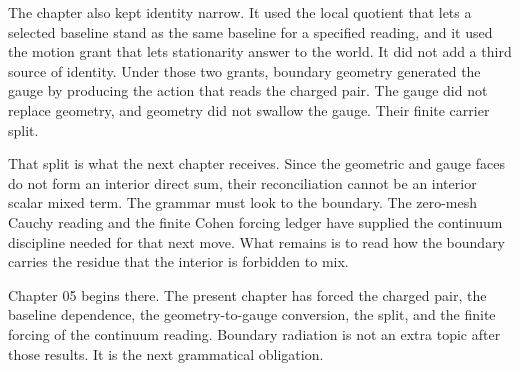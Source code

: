 The chapter also kept identity narrow. It used the local quotient that lets
a selected baseline stand as the same baseline for a specified reading, and
it used the motion grant that lets stationarity answer to the world. It did
not add a third source of identity. Under those two grants, boundary geometry
generated the gauge by producing the action that reads the charged pair.
The gauge did not replace geometry, and geometry did not swallow the gauge.
Their finite carrier split.

That split is what the next chapter receives. Since the geometric and gauge
faces do not form an interior direct sum, their reconciliation cannot be an
interior scalar mixed term. The grammar must look to the boundary. The
zero-mesh Cauchy reading and the finite Cohen forcing ledger have supplied
the continuum discipline needed for that next move. What remains is to read
how the boundary carries the residue that the interior is forbidden to mix.

Chapter 05 begins there. The present chapter has forced the charged pair,
the baseline dependence, the geometry-to-gauge conversion, the split, and
the finite forcing of the continuum reading. Boundary radiation is not an
extra topic after those results. It is the next grammatical obligation.
